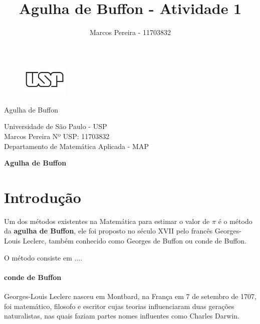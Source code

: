\documentclass[18pt]{article}
\title{Agulha de Buffon - Atividade 1}
\author{Marcos Pereira - 11703832}
\begin{document}
	\begin{figure}
		\centering
		\includegraphics[width=0.19\textwidth]{usp}
		\textsl{}	\end{figure}
	{\large Agulha de Buffon}
	\\
	
	
	\begin{flushleft}
		Universidade de São Paulo - USP
		\\
		
		Marcos Pereira \hspace{2cm} Nº USP: 11703832\\
		
		Departamento de Matemática Aplicada - MAP
		\vspace{.0cm}
		{\large \textbf{}}
	\end{flushleft}
\vspace{1cm}

\begin{center}
	{\Large \textbf{Agulha de Buffon}} 
\end{center}

\vspace{1cm}

\section{Introdução}

Um dos métodos existentes na Matemática para estimar o valor de $\pi$ é o método da \textbf{agulha de Buffon}, ele foi proposto no século XVII pelo francês Georges-Louis Leclerc, também conhecido como Georges de Buffon ou conde de Buffon.

O método consiste em ....\\

\paragraph{conde de Buffon}

Georges-Louis Leclerc nasceu em Montbard, na França em 7 de setembro de 1707, foi matemático, filosofo e escritor cujas teorias influenciaram duas gerações naturalistas, nas quais faziam partes nomes influentes como Charles Darwin.\\
\end{document}

